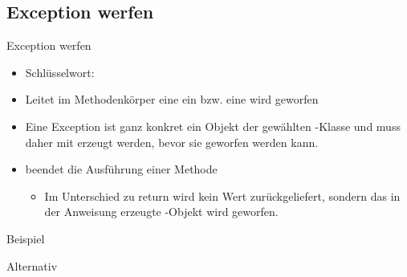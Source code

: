 \documentclass{../tuda-beamer}
\begin{document}
    \subsection{Exception werfen}
    \label{subsec:exception-werfen}
    \begin{frame}[c]{Exception werfen}
        \begin{itemize}
            \item Schlüsselwort: 
            \item Leitet im Methodenkörper eine  ein bzw. eine
             wird geworfen
            \item Eine Exception ist ganz konkret ein Objekt der gewählten
            -Klasse und muss daher mit  erzeugt werden,
            bevor sie geworfen werden kann.
            \item {} beendet die Ausführung einer Methode
            \begin{itemize}
                \item Im Unterschied zu return wird kein Wert zurückgeliefert, sondern das in der
                Anweisung erzeugte -Objekt wird geworfen.
            \end{itemize}
        \end{itemize}
    \end{frame}

    \begin{frame}[c]{Beispiel}
        
    \end{frame}

    \begin{frame}[c]{Alternativ}
        
    \end{frame}
\end{document}
